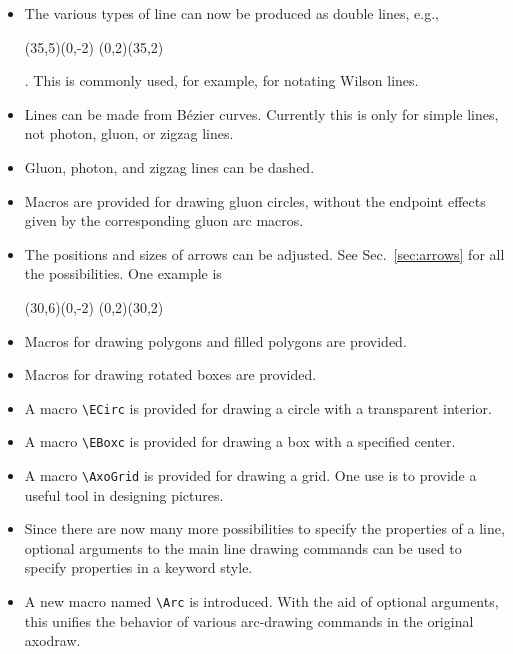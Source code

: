 \documentclass[12pt]{article}
\begin{document}
\begin{itemize}
\item The various types of line can now be produced as double lines,
  e.g.,
  \begin{axopicture}(35,5)(0,-2)
    \Line[double,sep=2.5](0,2)(35,2)
  \end{axopicture}.
  This is commonly used, for example, for notating Wilson lines. 

\item Lines can be made from B\'ezier curves.
  Currently this is only for simple lines, not photon, gluon, or
  zigzag lines.

\item Gluon, photon, and zigzag lines can be dashed.

\item Macros are provided for drawing gluon circles, without the
  endpoint effects given by the corresponding gluon arc macros.

\item The positions and sizes of arrows can be adjusted.  See Sec.\
  \ref{sec:arrows} for all the possibilities.  One example is 
  \begin{axopicture}(30,6)(0,-2)
    \Line[arrow,arrowpos=0.8](0,2)(30,2)
  \end{axopicture}

\item Macros for drawing polygons and filled polygons are provided.

\item Macros for drawing rotated boxes are provided.

\item A macro \verb+\ECirc+ is provided for drawing a circle with a
  transparent interior.

\item A macro \verb+\EBoxc+ is provided for drawing a box with a
  specified center.

\item A macro \verb+\AxoGrid+ is provided for drawing a grid.  One
  use is to provide a useful tool in designing pictures.

\item Since there are now many more possibilities to specify the
  properties of a line, optional arguments to the main line drawing
  commands can be used to specify properties in a keyword style.  

\item A new macro named \verb+\Arc+ is introduced.  With the aid of
  optional arguments, this unifies the behavior of various arc-drawing
  commands in the original axodraw.


\end{itemize}
\end{document}
